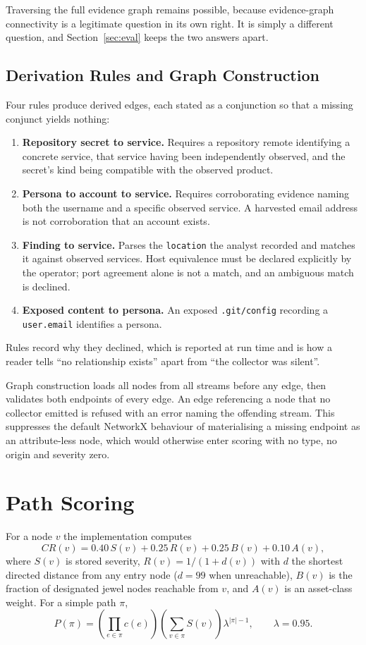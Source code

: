 \documentclass[11pt,a4paper]{article}
\begin{document}
Traversing the full evidence graph remains possible, because evidence-graph connectivity is a legitimate question in its own right. It is simply a different question, and Section~\ref{sec:eval} keeps the two answers apart.

\subsection{Derivation Rules and Graph Construction}
Four rules produce derived edges, each stated as a conjunction so that a missing conjunct yields nothing:

\begin{enumerate}[leftmargin=*]
\item \textbf{Repository secret to service.} Requires a repository remote identifying a concrete service, that service having been independently observed, and the secret's kind being compatible with the observed product.
\item \textbf{Persona to account to service.} Requires corroborating evidence naming both the username and a specific observed service. A harvested email address is not corroboration that an account exists.
\item \textbf{Finding to service.} Parses the \texttt{location} the analyst recorded and matches it against observed services. Host equivalence must be declared explicitly by the operator; port agreement alone is not a match, and an ambiguous match is declined.
\item \textbf{Exposed content to persona.} An exposed \texttt{.git/config} recording a \texttt{user.email} identifies a persona.
\end{enumerate}

Rules record why they declined, which is reported at run time and is how a reader tells ``no relationship exists'' apart from ``the collector was silent''.

Graph construction loads all nodes from all streams before any edge, then validates both endpoints of every edge. An edge referencing a node that no collector emitted is refused with an error naming the offending stream. This suppresses the default NetworkX behaviour of materialising a missing endpoint as an attribute-less node, which would otherwise enter scoring with no type, no origin and severity zero.

\section{Path Scoring}\label{sec:scoring}
For a node $v$ the implementation computes
\begin{equation}
CR(v)=0.40\,S(v)+0.25\,R(v)+0.25\,B(v)+0.10\,A(v),\label{eq:cr}
\end{equation}
where $S(v)$ is stored severity, $R(v)=1/(1+d(v))$ with $d$ the shortest directed distance from any entry node ($d=99$ when unreachable), $B(v)$ is the fraction of designated jewel nodes reachable from $v$, and $A(v)$ is an asset-class weight. For a simple path $\pi$,
\begin{equation}
P(\pi)=\left(\prod_{e\in\pi}c(e)\right)\left(\sum_{v\in\pi}S(v)\right)\lambda^{|\pi|-1},\qquad \lambda=0.95.\label{eq:path}
\end{equation}
\end{document}
